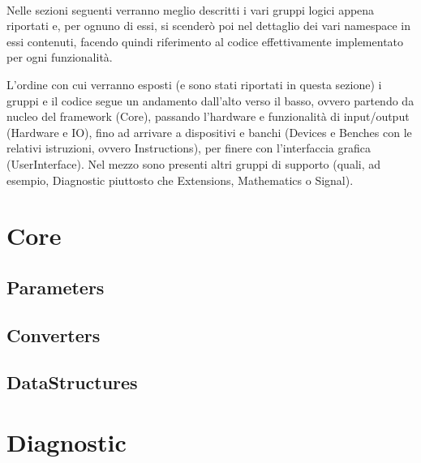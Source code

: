 \documentclass{article}
\begin{document}
		\paragraph*{}
		Nelle sezioni seguenti verranno meglio descritti i vari gruppi logici appena riportati e, per ognuno di essi, si scenderò poi nel dettaglio dei vari namespace in essi contenuti, facendo quindi riferimento al codice effettivamente implementato per ogni funzionalità.
		\par
		L'ordine con cui verranno esposti (e sono stati riportati in questa sezione) i gruppi e il codice segue un andamento dall'alto verso il basso, ovvero partendo da nucleo del framework (Core), passando l'hardware e funzionalità di input/output (Hardware e IO), fino ad arrivare a dispositivi e banchi (Devices e Benches con le relativi istruzioni, ovvero Instructions), per finere con l'interfaccia grafica (UserInterface).
		\newline
		Nel mezzo sono presenti altri gruppi di supporto (quali, ad esempio, Diagnostic piuttosto che Extensions, Mathematics o Signal).
	\newpage
	
	\section{Core} \label{section:Core}
	
	\newpage
	
	\subsection{Parameters} \label{subsection:Parameters}
		
	\newpage
	
	\subsection{Converters} \label{subsection:Converters}
	
	\newpage
	
	\subsection{DataStructures} \label{subsection:DataStructures}
	
	\newpage
	
	\section{Diagnostic} \label{section:Diagnostic}
	
\end{document}
